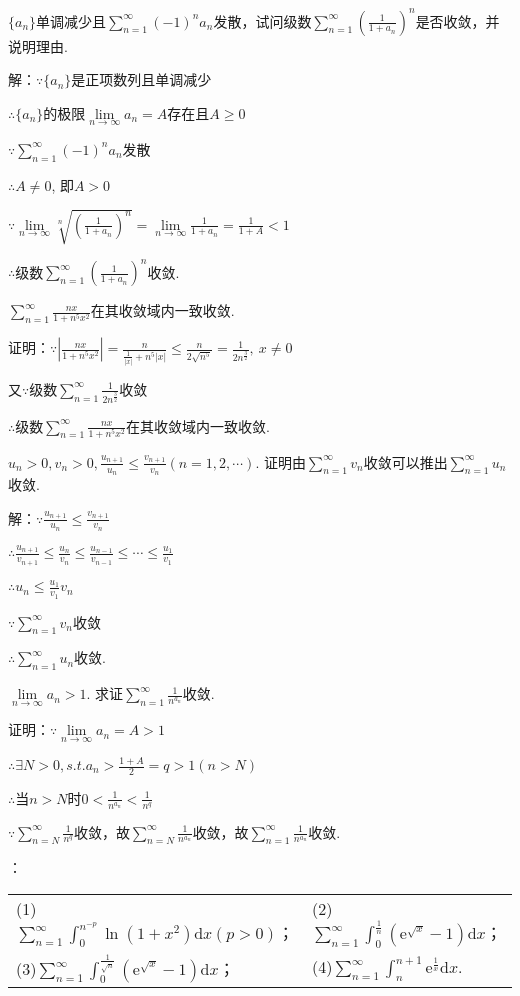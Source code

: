 \documentclass[12pt,UTF8]{ctexart}
\newcommand\Lim[0]{\lim\limits_{n\rightarrow\infty}}
\newcommand\Ser[1]{\sum_{n=#1}^\infty}
\begin{document}
\begin{enumerate}
$\{a_n\}$单调减少且$\Ser{1}(-1)^na_n$发散，试问级数$\Ser{1}(\frac1{1+a_n})^n$是否收敛，并说明理由.

解：$\because\{a_n\}$是正项数列且单调减少

$\therefore\{a_n\}$的极限$\Lim a_n=A$存在且$A\geq0$

$\because\Ser{1}(-1)^na_n$发散

$\therefore A\neq0$, 即$A>0$

$\because\Lim\sqrt[n]{(\frac1{1+a_n})^n}=\Lim\frac1{1+a_n}=\frac1{1+A}<1$

$\therefore$级数$\Ser{1}(\frac1{1+a_n})^n$收敛.

$\Ser{1}\frac{nx}{1+n^5x^2}$在其收敛域内一致收敛.

证明：$\because|\frac{nx}{1+n^5x^2}|=\frac n{\frac1{|x|}+n^5|x|}\leq\frac n{2\sqrt{n^5}}=\frac1{2n^{\frac32}},\ x\neq0$

又$\because$级数$\Ser1\frac1{2n^{\frac32}}$收敛

$\therefore$级数$\Ser{1}\frac{nx}{1+n^5x^2}$在其收敛域内一致收敛.

$u_n>0,v_n>0,\frac{u_{n+1}}{u_n}\leq\frac{v_{n+1}}{v_n}(n=1,2,\cdots)$. 证明由$\Ser{1}v_n$收敛可以推出$\Ser{1}u_n$收敛.

解：$\because\frac{u_{n+1}}{u_n}\leq\frac{v_{n+1}}{v_n}$

$\therefore\frac{u_{n+1}}{v_{n+1}}\leq\frac{u_n}{v_n}\leq\frac{u_{n-1}}{v_{n-1}}\leq\cdots\leq\frac{u_1}{v_1}$

$\therefore u_n\leq\frac{u_1}{v_1}v_n$

$\because\Ser{1}v_n$收敛

$\therefore\Ser{1}u_n$收敛.

$\Lim a_n>1$. 求证$\Ser{1}\frac1{n^{a_n}}$收敛.


证明：$\because\Lim a_n=A>1$

$\therefore\exists N>0,s.t.a_n>\frac{1+A}2=q>1(n>N)$

$\therefore$当$n>N$时$0<\frac1{n^{a_n}}<\frac1{n^q}$

$\because\Ser{N}\frac1{n^q}$收敛，故$\Ser{N}\frac1{n^{a_n}}$收敛，故$\Ser{1}\frac1{n^{a_n}}$收敛.

：

\begin{tabular}{ll}
(1)$\Ser{1}\int_0^{n^{-p}}\ln(1+x^2)\mathrm dx(p>0)$；& (2)$\Ser{1}\int_0^{\frac1n}(\mathrm e^{\sqrt x}-1)\mathrm dx$；\\
(3)$\Ser{1}\int_0^{\frac1{\sqrt n}}(\mathrm e^{\sqrt x}-1)\mathrm dx$；& (4)$\Ser{1}\int_n^{n+1}\mathrm e^{\frac1x}\mathrm dx$.
\end{tabular}


\end{enumerate}
\end{document}
